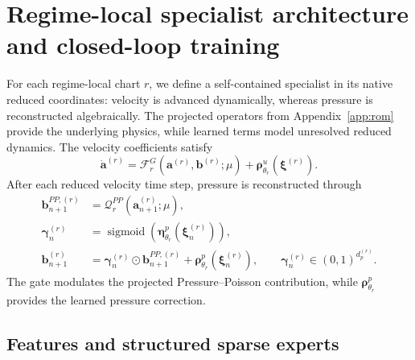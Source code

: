 
\section{Regime-local specialist architecture and closed-loop training}
\label{app:specialists}

For each regime-local chart $r$, we define a self-contained 
specialist in its native reduced coordinates: velocity is advanced
dynamically, whereas pressure is reconstructed algebraically.
The projected operators from Appendix~\ref{app:rom} provide the underlying physics, while learned terms model unresolved reduced dynamics. The velocity coefficients satisfy
\begin{equation}
  \dot{\bm a}^{(r)}
  =
  \mathcal F_r^G
  \left(
    \bm a^{(r)},\bm b^{(r)};\mu
  \right)
  +
  \bm\rho^u_{\theta_r}
  \left(
    \bm\xi^{(r)}
  \right).
  \label{eq:app_hybrid_velocity_rhs}
\end{equation}
After each reduced velocity time step, pressure is reconstructed through
\begin{align}
  \bm b_{n+1}^{PP,(r)}
  &=
  \mathcal Q_r^{PP}
  \left(
    \bm a_{n+1}^{(r)};\mu
  \right),
  \nonumber\\
  \bm\gamma_n^{(r)}
  &=
  \operatorname{sigmoid}
  \left(
    \bm\eta^p_{\theta_r}
    (\bm\xi_n^{(r)})
  \right),
  \nonumber\\
  \bm b_{n+1}^{(r)}
  &=
  \bm\gamma_n^{(r)}
  \odot
  \bm b_{n+1}^{PP,(r)}
  +
  \bm\rho^p_{\theta_r}
  (\bm\xi_n^{(r)}),
  \qquad
  \bm\gamma_n^{(r)}
  \in(0,1)^{d_p^{(r)}}.
  \label{eq:app_pressure_closure}
\end{align}
The gate modulates the projected Pressure--Poisson contribution, while
$\bm\rho^p_{\theta_r}$ provides the learned pressure correction.


\subsection{Features and structured sparse experts}

